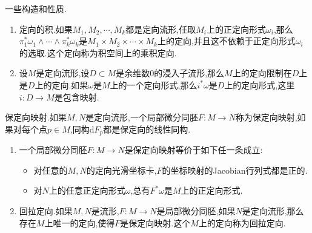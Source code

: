 一些构造和性质.
\begin{enumerate}
	\item 定向的积.如果$M_1,M_2,\cdots,M_k$都是定向流形,任取$M_i$上的正定向形式$\omega_i$,那么$\pi_1^*\omega_1\wedge\cdots\wedge\pi_k^*\omega_k$是$M_1\times M_2\times\cdots\times M_k$上的定向,并且这不依赖于正定向形式$\omega_i$的选取.这个定向称为积空间上的乘积定向.
	\item 设$M$是定向流形,设$D\subset M$是余维数0的浸入子流形,那么$M$上的定向限制在$D$上是$D$上的定向.如果$\omega$是$M$上的一个定向形式,那么$i^*\omega$是$D$上的定向形式,这里$i:D\to M$是包含映射.
\end{enumerate}

保定向映射.如果$M,N$是定向流形,一个局部微分同胚$F:M\to N$称为保定向映射,如果对每个点$p\in M$,同构$\mathrm{d}F_p$都是保定向的线性同构.
\begin{enumerate}
	\item 一个局部微分同胚$F:M\to N$是保定向映射等价于如下任一条成立:
	\begin{itemize}
		\item 对任意的$M,N$的定向光滑坐标卡,$F$的坐标映射的Jacobian行列式都是正的.
		\item 对$N$上的任意正定向形式$\omega$,总有$F^*\omega$是$M$上的正定向形式.
	\end{itemize}
    \item 回拉定向.如果$M,N$是流形,$F:M\to N$是局部微分同胚,如果$N$是定向流形,那么存在$M$上唯一的定向,使得$F$是保定向映射.这个$M$上的定向称为回拉定向.
\end{enumerate}

